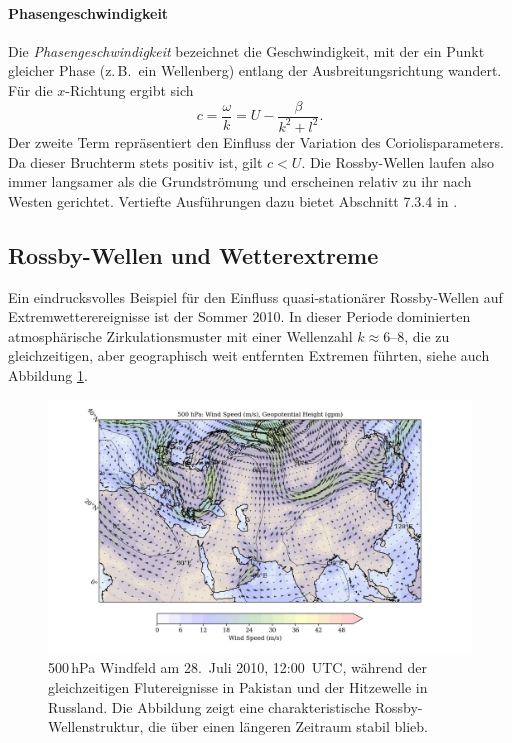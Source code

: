 \paragraph{Phasengeschwindigkeit}
Die \emph{Phasengeschwindigkeit} bezeichnet die Geschwindigkeit, mit der ein
%
Punkt gleicher Phase (z.\,B.\ ein Wellenberg) entlang der Ausbreitungsrichtung
wandert. Für die $x$-Richtung ergibt sich
\begin{equation}
	c = \frac{\omega}{k} = U - \frac{\beta}{k^2+l^2}.
	\label{rossby:phasengeschwindigkeit}
\end{equation}
Der zweite Term repräsentiert den Einfluss der Variation des Coriolisparameters.
Da dieser Bruchterm stets positiv ist, gilt $c < U$.
Die Rossby-Wellen laufen also immer langsamer als die Grundströmung und
erscheinen relativ zu ihr nach Westen gerichtet.
Vertiefte Ausführungen dazu bietet Abschnitt 7.3.4 in \cite{rossby:mueller2018}.

\subsection{Rossby-Wellen und Wetterextreme}


Ein eindrucksvolles Beispiel für den Einfluss quasi-stationärer Rossby-Wellen
auf Extremwetterereignisse ist der Sommer 2010. In dieser Periode dominierten
atmosphärische Zirkulationsmuster mit einer Wellenzahl \(k \approx \text{6--8}\), die zu
gleichzeitigen, aber geographisch weit entfernten Extremen führten, siehe auch Abbildung \ref{fig:rossby_2010}.


\begin{figure}
	\centering
	\includegraphics[width=\textwidth, trim=2cm 0cm 3cm 0cm, clip]{papers/rossby/images/data_2010_7_28_12_00_500.jpg}
	\caption{500\,hPa Windfeld am
		28.\ Juli 2010, 12:00~UTC, während der gleichzeitigen Flutereignisse in Pakistan und
%
%
		der Hitzewelle in Russland. Die Abbildung zeigt eine charakteristische Rossby-Wellenstruktur,
%
%
		die über einen längeren Zeitraum stabil blieb.}
	\label{fig:rossby_2010}
\end{figure}



